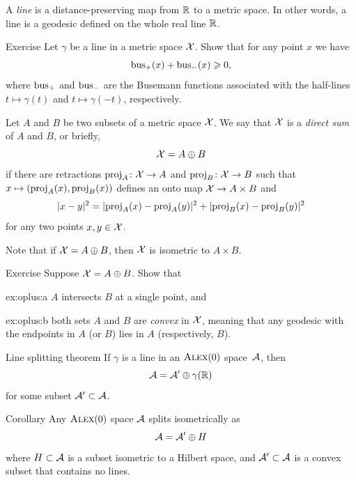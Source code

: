 A \emph{line} is a distance-preserving map
from $\mathbb{R}$ to a metric space.
In other words, a line is a geodesic defined on the whole real line $\mathbb{R}$.

\begin{thm}[!]{Exercise}\label{ex:bus+bus}
Let $\gamma$ be a line in a metric space $\mathcal{X}$.
Show that for any point $x$ we have
\[\operatorname{\rm bus}\nolimits_+(x)+\operatorname{\rm bus}\nolimits_-(x)\geqslant 0,\]
where $\operatorname{\rm bus}\nolimits_+$ and $\operatorname{\rm bus}\nolimits_-$ are the Busemann functions associated with the half-lines $t\mapsto\gamma(t)$ and $t\mapsto\gamma(-t)$, respectively.
\end{thm}


Let $A$ and $B$ be two subsets of a metric space $\mathcal{X}$.
We say that $\mathcal{X}$ is a \emph{direct sum} of $A$ and $B$,
or briefly,
\[\mathcal{X}=A\oplus B\]
if there are retractions $\operatorname{\rm proj}\nolimits_A\colon\mathcal{X}\to A$
and 
$\operatorname{\rm proj}\nolimits_B\colon\mathcal{X}\to B$
such that $x\mapsto(\operatorname{\rm proj}\nolimits_A(x),\operatorname{\rm proj}\nolimits_B(x))$ defines an onto map $\mathcal{X}\to A\times B$ and
\[\dist[2]{x}{y}{}=\dist[2]{\proj_A(x)}{\proj_A(y)}{}+\dist[2]{\proj_B(x)}{\proj_B(y)}{}\]
for any two points $x,y\in \mathcal{X}$.

Note that if $\mathcal{X}=A\oplus B$, then $\mathcal{X}$ is isometric to $A\times B$.

\begin{thm}{Exercise}\label{ex:oplus}
Suppose $\mathcal{X}=A\oplus B$.
Show that
\begin{subthm}{ex:oplus:a}
 $A$ intersects $B$ at a single point, and
\end{subthm}

\begin{subthm}{ex:oplus:b}
both sets $A$ and $B$ are \emph{convex} in $\mathcal{X}$, meaning that any geodesic with the endpoints in $A$ (or $B$) lies in $A$ (respectively, $B$).
\end{subthm}

\end{thm}


\begin{thm}{Line splitting theorem}\label{thm:splitting}
If $\gamma$ is a line in an $\textup{\textsc{Alex}}(0)$ space~$\mathcal{A}$, then
\[\mathcal{A}=\mathcal{A}'\oplus \gamma(\mathbb{R})\]
for some subset $\mathcal{A}'\subset \mathcal{A}$.
\end{thm}

\begin{thm}{Corollary}\label{cor:splitting}
Any $\textup{\textsc{Alex}}(0)$ space $\mathcal{A}$ splits isometrically as
\[
\mathcal{A}=\mathcal{A}'\oplus H
\]
where $H\subset \mathcal{A}$ is a subset isometric to a Hilbert space, and $\mathcal{A}'\subset \mathcal{A}$ is a convex subset that contains no lines. 
\end{thm}


